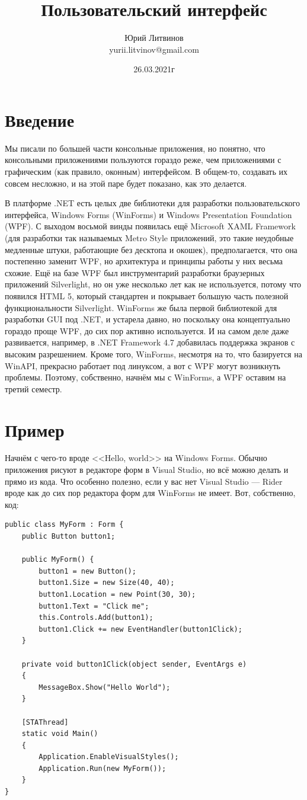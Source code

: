 \documentclass[a5paper]{article}
\title{Пользовательский интерфейс}
\author{Юрий Литвинов\\\small{yurii.litvinov@gmail.com}}
\date{26.03.2021г}
\begin{document}
\maketitle
\thispagestyle{empty}

\section{Введение}

Мы писали по большей части консольные приложения, но понятно, что консольными приложениями пользуются гораздо реже, чем приложениями с графическим (как правило, оконным) интерфейсом. В общем-то, создавать их совсем несложно, и на этой паре будет показано, как это делается. 

В платформе .NET есть целых две библиотеки для разработки пользовательского интерфейса, Windows Forms (WinForms) и Windows Presentation Foundation (WPF). С выходом восьмой винды появилась ещё Microsoft XAML Framework (для разработки так называемых Metro Style приложений, это такие неудобные медленные штуки, работающие без десктопа и окошек), предполагается, что она постепенно заменит WPF, но архитектура и принципы работы у них весьма схожие. Ещё на базе WPF был инструментарий разработки браузерных приложений Silverlight, но он уже несколько лет как не используется, потому что появился HTML 5, который стандартен и покрывает большую часть полезной функциональности Silverlight. WinForms же была первой библиотекой для разработки GUI под .NET, и устарела давно, но поскольку она концептуально гораздо проще WPF, до сих пор активно используется. И на самом деле даже развивается, например, в .NET Framework 4.7 добавилась поддержка экранов с высоким разрешением. Кроме того, WinForms, несмотря на то, что базируется на WinAPI, прекрасно работает под линуксом, а вот с WPF могут возникнуть проблемы. Поэтому, собственно, начнём мы с WinForms, а WPF оставим на третий семестр.

\section{Пример}

Начнём с чего-то вроде <<Hello, world>> на Windows Forms. Обычно приложения рисуют в редакторе форм в Visual Studio, но всё можно делать и прямо из кода. Что особенно полезно, если у вас нет Visual Studio --- Rider вроде как до сих пор редактора форм для WinForms не имеет. Вот, собственно, код:

\begin{verbatim}
public class MyForm : Form {
    public Button button1;

    public MyForm() {
        button1 = new Button();
        button1.Size = new Size(40, 40);
        button1.Location = new Point(30, 30);
        button1.Text = "Click me";
        this.Controls.Add(button1);
        button1.Click += new EventHandler(button1Click);
    }

    private void button1Click(object sender, EventArgs e)
    {
        MessageBox.Show("Hello World");
    }

    [STAThread]
    static void Main()
    {
        Application.EnableVisualStyles();
        Application.Run(new MyForm());
    }
}
\end{verbatim}
\end{document}
